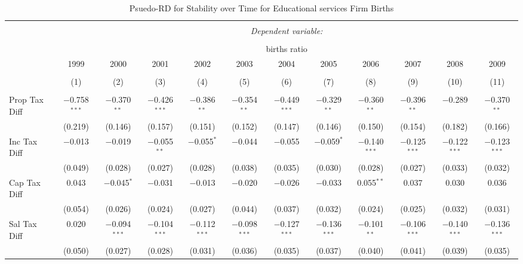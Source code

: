 
\begin{table}[!htbp] \centering 
  \caption{Psuedo-RD for Stability over Time for  Educational services Firm Births} 
  \label{61year} 
\small 
\begin{tabular}{@{\extracolsep{5pt}}lccccccccccc} 
\\[-1.8ex]\hline 
\hline \\[-1.8ex] 
 & \multicolumn{11}{c}{\textit{Dependent variable:}} \\ 
\cline{2-12} 
\\[-1.8ex] & \multicolumn{11}{c}{births ratio} \\ 
 & 1999 & 2000 & 2001 & 2002 & 2003 & 2004 & 2005 & 2006 & 2007 & 2008 & 2009 \\ 
\\[-1.8ex] & (1) & (2) & (3) & (4) & (5) & (6) & (7) & (8) & (9) & (10) & (11)\\ 
\hline \\[-1.8ex] 
 Prop Tax Diff & $-$0.758$^{***}$ & $-$0.370$^{**}$ & $-$0.426$^{***}$ & $-$0.386$^{**}$ & $-$0.354$^{**}$ & $-$0.449$^{***}$ & $-$0.329$^{**}$ & $-$0.360$^{**}$ & $-$0.396$^{**}$ & $-$0.289 & $-$0.370$^{**}$ \\ 
  & (0.219) & (0.146) & (0.157) & (0.151) & (0.152) & (0.147) & (0.146) & (0.150) & (0.154) & (0.182) & (0.166) \\ 
  Inc Tax Diff & $-$0.013 & $-$0.019 & $-$0.055$^{**}$ & $-$0.055$^{*}$ & $-$0.044 & $-$0.055 & $-$0.059$^{*}$ & $-$0.140$^{***}$ & $-$0.125$^{***}$ & $-$0.122$^{***}$ & $-$0.123$^{***}$ \\ 
  & (0.049) & (0.028) & (0.027) & (0.028) & (0.038) & (0.035) & (0.030) & (0.028) & (0.027) & (0.033) & (0.032) \\ 
  Cap Tax Diff & 0.043 & $-$0.045$^{*}$ & $-$0.031 & $-$0.013 & $-$0.020 & $-$0.026 & $-$0.033 & 0.055$^{**}$ & 0.037 & 0.030 & 0.036 \\ 
  & (0.054) & (0.026) & (0.024) & (0.027) & (0.044) & (0.037) & (0.032) & (0.024) & (0.025) & (0.032) & (0.031) \\ 
  Sal Tax Diff & 0.020 & $-$0.094$^{***}$ & $-$0.104$^{***}$ & $-$0.112$^{***}$ & $-$0.098$^{***}$ & $-$0.127$^{***}$ & $-$0.136$^{***}$ & $-$0.101$^{**}$ & $-$0.106$^{***}$ & $-$0.140$^{***}$ & $-$0.136$^{***}$ \\ 
  & (0.050) & (0.027) & (0.028) & (0.031) & (0.036) & (0.035) & (0.037) & (0.040) & (0.041) & (0.039) & (0.035) \\ 

\end{tabular}
\end{table}
